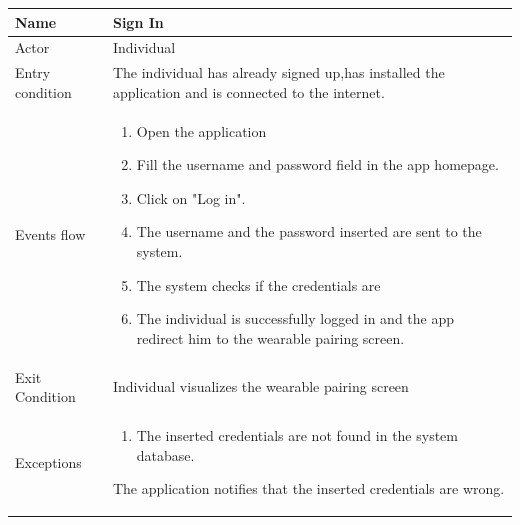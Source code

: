 \begin{tabular}{|l|p{11cm}|}
    \hline
    Name & Sign In
    \\ \hline
    Actor & Individual
    \\ \hline 
    Entry condition & The individual has already signed up,has installed the application and is connected to the internet.
    \\ \hline
    Events flow &
    \begin{enumerate}
    \item Open the application
    \item Fill the username and password field in the app homepage.
    \item Click on "Log in".
    \item The username and the password inserted are sent to the system.
    \item The system checks if the credentials are 
    \item The individual is successfully logged in and the app redirect him to the wearable pairing screen.
    \end{enumerate}
     \\ \hline
     Exit Condition & Individual visualizes the wearable pairing screen
     \\
    \hline
    Exceptions &
        \begin{enumerate}
    \item The inserted credentials are not found in the system database. 
    
    \end{enumerate}
   The application notifies that the inserted credentials are wrong.
      \\
    \hline
\end{tabular}


